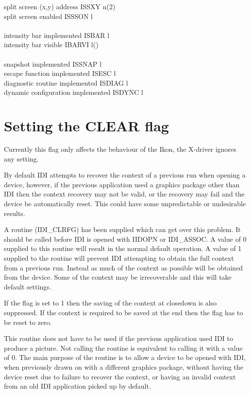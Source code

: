 \begin{tabbing}
split screen (x,y) address  \> ISSXY \> n(2) \\
split screen enabled  \> ISSSON \> l \\
\\
intensity bar implemented  \> ISBAR \> l \\
intensity bar visible  \> IBARVI \> l() \\
\\
snapshot implemented  \> ISSNAP \> l \\
escape function implemented  \> ISESC \> l \\
diagnostic routine implemented  \> ISDIAG \> l \\
dynamic configuration implemented  \> ISDYNC \> l \\
\end{tabbing}

\newpage
\section{Setting the CLEAR flag}
\label{se:scf}

Currently this flag only affects the behaviour of the Ikon, the X-driver
ignores any setting.

By default IDI attempts to recover the context of a previous run when
opening a device, however, if the previous application used a graphics
package other than IDI then the context recovery may not be valid, or
the recovery may fail and the device be automatically reset.
This could have some unpredictable or undesirable results.

A routine (IDI\_CLRFG) has been supplied which can get over this problem.
It should be called before IDI is opened with IIDOPN or IDI\_ASSOC.
A value of 0 supplied to this routine will result in the normal default
operation. A value of 1 supplied to the routine will prevent IDI
attempting to obtain the full context from a previous run.
Instead as much of the context as possible will be obtained from the device.
Some of the context may be irrecoverable and this will take default settings.

If the flag is set to 1 then the saving of the context
at closedown is also suppressed. If the context is required to be saved at
the end then the flag has to be reset to zero.

This routine does not have to be used if the previous application used
IDI to produce a picture. Not calling the routine is equivalent to calling
it with a value of 0. The main purpose of the routine is to allow a device
to be opened with IDI, when previously drawn on with a different graphics
package, without having the device reset due to failure to recover the
context, or having an invalid context from an old IDI application picked
up by default.

